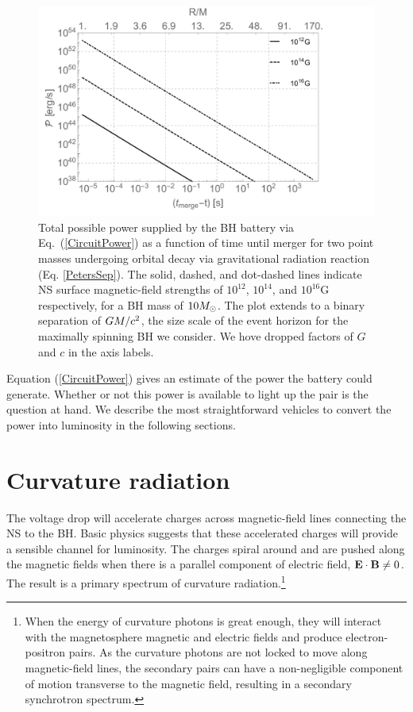 \begin{figure}
\begin{center}
\includegraphics[scale=0.36]{figures/ch7/Lum_vs_t.pdf}
\end{center}
\caption{Total possible power supplied by the BH battery via
  Eq.\ (\ref{CircuitPower}) as a function of time until merger for two
  point masses undergoing orbital decay via gravitational radiation
  reaction (Eq. \ref{PetersSep}). The solid, dashed, and dot-dashed
  lines indicate NS surface magnetic-field strengths of $10^{12}$,
  $10^{14}$, and $10^{16}$G respectively, for a BH mass of $10
  {M_{\odot}}$. The plot extends to a binary separation of $GM/c^2$, the
  size scale of the event horizon for the maximally spinning BH we
  consider. We hove dropped factors of $G$ and $c$ in the axis
  labels.}
\label{Fig:Lum_B_M}
\end{figure}

Equation (\ref{CircuitPower}) gives an estimate of the power the battery could
generate. Whether or not this power is available to light up the pair
is the question at hand. We describe the most straightforward vehicles
to convert the power into luminosity in the following sections.

\section{Curvature radiation}
The voltage drop will accelerate charges across magnetic-field lines
connecting the NS to the BH. Basic physics suggests that these
accelerated charges will provide a sensible channel for luminosity.
The charges spiral around and are pushed along the magnetic fields
when there is a parallel component of electric field, ${\bf E} \cdot
{\bf B} \ne 0$.  The result is a primary spectrum of curvature
radiation.\footnote{When the energy of curvature photons is great
  enough, they will interact with the magnetosphere magnetic and
  electric fields and produce electron-positron 
  pairs. As the curvature photons are not locked to move along
  magnetic-field lines, the secondary pairs can have a non-negligible
  component of motion transverse to the magnetic field, resulting in a
  secondary synchrotron spectrum.}

